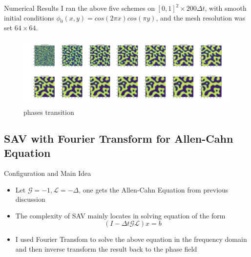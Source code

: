 \documentclass[9pt]{beamer}
\begin{document}
\begin{frame}{Numerical Results}
I ran the above five schemes on $[0,1]^2 \times 200\Delta t $, with smooth initial conditions $\phi_0(x,y) = cos(2\pi x)cos(\pi y)$, and the mesh resolution was set $64\times64$.

\begin{figure}[H]
  \centering
  \includegraphics[scale=0.18]{phases/ch_phases.jpeg}
 \caption{phases transition}
 \label{fig:1}
\end{figure}
\end{frame}

\subsection{SAV with Fourier Transform for Allen-Cahn Equation}
\begin{frame}{Configuration and Main Idea}
\begin{itemize}
\item{Let $\mathcal G=-1, \mathcal L = -\Delta$, one gets the Allen-Cahn Equation from previous discussion}\item{The complexity of SAV mainly locates in solving equation of the form $$(I-\Delta t \mathcal{G L}) x = b$$}\item{I used Fourier Transfom to solve the above equation in the frequency domain and then inverse transform the result back to the phase field}
\end{itemize}
\end{frame}
\end{document}

